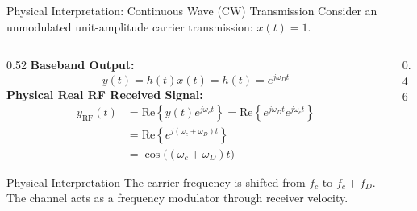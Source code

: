 \documentclass[aspectratio=169, 10pt]{beamer}
\begin{document}
\begin{frame}{Physical Interpretation: Continuous Wave (CW) Transmission}
\small
    Consider an unmodulated unit-amplitude carrier transmission: $x(t) = 1$.
    
    \begin{columns}[T]
        \begin{column}{0.52\textwidth}
            \textbf{Baseband Output:}
            \begin{equation}
                y(t) = h(t) x(t) = h(t) = e^{j\omega_D t}
            \end{equation}
            \textbf{Physical Real RF Received Signal:}
            \begin{align}
                y_{\text{RF}}(t) &= \text{Re}\left\{ y(t) e^{j\omega_c t} \right\} = \text{Re}\left\{ e^{j\omega_D t} e^{j\omega_c t} \right\} \nonumber \\
                                 &= \text{Re}\left\{ e^{j(\omega_c + \omega_D)t} \right\} \nonumber \\
                                 &= \boxed{\cos\Big( (\omega_c + \omega_D) t \Big)}
            \end{align}
            \begin{block}{Physical Interpretation}
                The carrier frequency is shifted from $f_c$ to $f_c + f_D$. The channel acts as a frequency modulator through receiver velocity.
            \end{block}
        \end{column}

        \begin{column}{0.46\textwidth}
            \begin{center}
            

\end{center}
\end{column}
\end{columns}
\end{frame}
\end{document}

